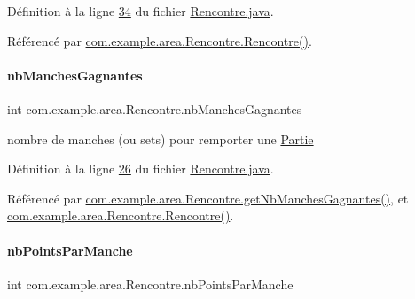 Définition à la ligne \hyperlink{_rencontre_8java_source_l00034}{34} du fichier \hyperlink{_rencontre_8java_source}{Rencontre.\+java}.



Référencé par \hyperlink{_rencontre_8java_source_l00041}{com.\+example.\+area.\+Rencontre.\+Rencontre()}.

\mbox{\label{classcom_1_1example_1_1area_1_1_rencontre_aef266bd256aecd70fbd02cf07625ed14}} 
\paragraph{\texorpdfstring{nb\+Manches\+Gagnantes}{nbManchesGagnantes}}
{\footnotesize\ttfamily int com.\+example.\+area.\+Rencontre.\+nb\+Manches\+Gagnantes\hspace{0.3cm}{\ttfamily [private]}}



nombre de manches (ou sets) pour remporter une \hyperlink{classcom_1_1example_1_1area_1_1_partie}{Partie} 



Définition à la ligne \hyperlink{_rencontre_8java_source_l00026}{26} du fichier \hyperlink{_rencontre_8java_source}{Rencontre.\+java}.



Référencé par \hyperlink{_rencontre_8java_source_l00204}{com.\+example.\+area.\+Rencontre.\+get\+Nb\+Manches\+Gagnantes()}, et \hyperlink{_rencontre_8java_source_l00058}{com.\+example.\+area.\+Rencontre.\+Rencontre()}.

\mbox{\label{classcom_1_1example_1_1area_1_1_rencontre_ae1849c4bcdcfbb2d336b750a36be1162}} 
\paragraph{\texorpdfstring{nb\+Points\+Par\+Manche}{nbPointsParManche}}
{\footnotesize\ttfamily int com.\+example.\+area.\+Rencontre.\+nb\+Points\+Par\+Manche\hspace{0.3cm}{\ttfamily [private]}}



